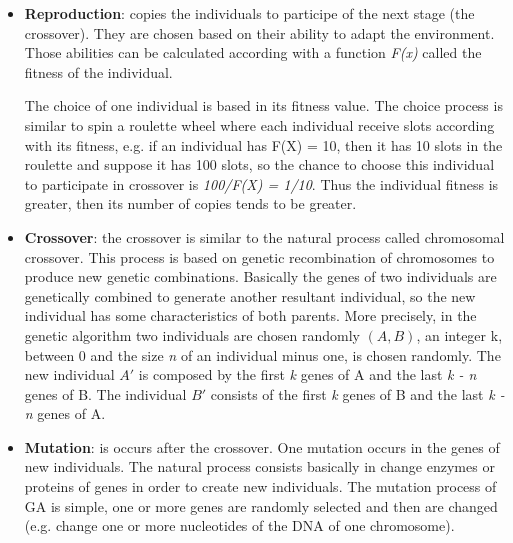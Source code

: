 \begin{itemize}
	\item \textbf{Reproduction}: copies the individuals to participe of the next
	stage (the crossover). They are chosen based on their ability to adapt the environment.
	Those abilities can be calculated according with a function \textit{F(x)} called
	the fitness of the individual.

    The choice of one individual is based in its fitness value. The choice process
	is similar to spin a roulette wheel where each individual receive slots according
    with its fitness, e.g. if an individual has F(X) = 10, then it has 10 slots
    in the roulette and suppose it has 100 slots, so the chance to choose this individual
    to participate in crossover is {\it100/F(X) = 1/10}. Thus the individual
    fitness is greater, then its number of copies tends to be greater.

	\item \textbf{Crossover}: the crossover is similar to the natural process called
	chromosomal crossover. This process is based on genetic recombination of
	chromosomes	to produce new genetic combinations. Basically the genes of two
    individuals are genetically combined to generate another resultant individual,
    so the new individual has some characteristics of both parents.
	More precisely, in the genetic algorithm two individuals are chosen randomly $(A, B)$,
	an integer k, between 0 and the size {\it n} of an individual minus one, is chosen
	randomly. The new individual $A'$ is composed by the first {\it k} genes of A
	and the last {\it k - n} genes of B. The individual $B'$ consists of the
	first {\it k} genes of B and the last {\it k - n} genes of A. 

	\item \textbf{Mutation}: is occurs after the crossover. One mutation occurs in the
	genes of new individuals. The natural process consists basically in change enzymes
    or proteins of genes in order to create new individuals. The mutation process
	of GA is simple, one or more genes are randomly selected and then are changed
    (e.g. change one or more nucleotides of the DNA	of one chromosome).

\end{itemize}


